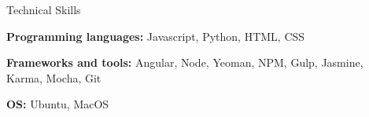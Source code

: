 \begin{rubric}{Technical Skills}

  \entry* \textbf{Programming languages:} Javascript, Python, HTML, CSS

  \entry* \textbf{Frameworks and tools:} Angular, Node, Yeoman, NPM, Gulp, Jasmine, Karma, Mocha, Git

  \entry* \textbf{OS:} Ubuntu, MacOS


\end{rubric}
